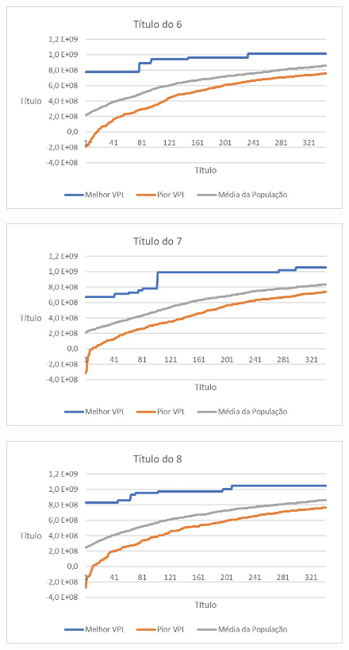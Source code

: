 \documentclass[12pt,a4paper]{report}
\begin{document}
\begin{figure}[H]
\centering

\includegraphics[scale=1]{AGRPCO1/6}

\end{figure}
\begin{figure}[H]
\centering

\includegraphics[scale=1]{AGRPCO1/7}

\end{figure}
\begin{figure}[H]
\centering

\includegraphics[scale=1]{AGRPCO1/8}

\end{figure}
\end{document}
